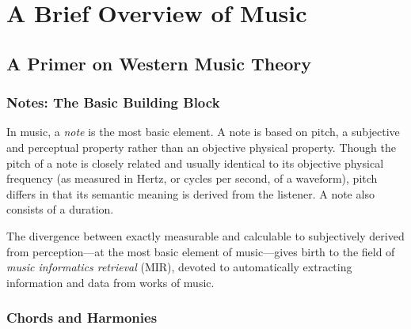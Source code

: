 \chapter{A Brief Overview of Music}

\section{A Primer on Western Music Theory}

\subsection{Notes: The Basic Building Block}

In music, a \textit{note} is the most basic element. A note is based on pitch, a subjective and perceptual property rather than an objective physical property. Though the pitch of a note is closely related and usually identical to its objective physical frequency (as measured in Hertz, or cycles per second, of a waveform), pitch differs in that its semantic meaning is derived from the listener. A note also consists of a duration.

The divergence between exactly measurable and calculable to subjectively derived from perception---at the most basic element of music---gives birth to the field of \textit{music informatics retrieval} (MIR), devoted to automatically extracting information and data from works of music.

\subsection{Chords and Harmonies}